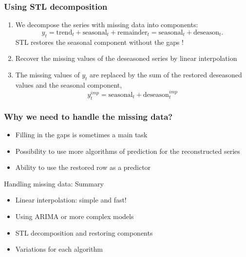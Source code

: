 \begin{frame}
	\frametitle{Using STL decomposition}
	
	\begin{enumerate}[<+->]
		\item We decompose the series with missing data into components:
		\[
		y_t = \text{trend}_t + \text{seasonal}_t + \text{remainder}_t = \text{seasonal}_t + \text{deseason}_t.
		\]	
		STL restores the \alert{seasonal component} without the gaps
		!
		\item Recover the missing values of the deseasoned series by \alert{linear} interpolation
		
		\item The missing values of $y_t$ are replaced by the sum of the restored deseasoned values and the seasonal component,
		\[
		y_t^{imp} = \text{seasonal}_t + \text{deseason}_t^{imp}
		\]
		
	\end{enumerate}
	
\end{frame}

\begin{frame}
	\frametitle{Why we need to handle the missing data?}
	
	\begin{itemize}[<+->]
		\item Filling in the gaps is sometimes a \alert{main task}
		\item Possibility to use \alert{more algorithms} of prediction for the reconstructed series
		\item Ability to use the restored row \alert{as a predictor}
	\end{itemize}
	
	
\end{frame}


\begin{frame}{Handling missing data: Summary}
	
	\begin{itemize}[<+->]
		\item Linear \alert{interpolation}: simple and fast!
		\item Using \alert{ARIMA} or more complex models
		\item \alert{STL decomposition} and restoring components
		\item \alert{Variations} for each algorithm
	\end{itemize}
\end{frame}